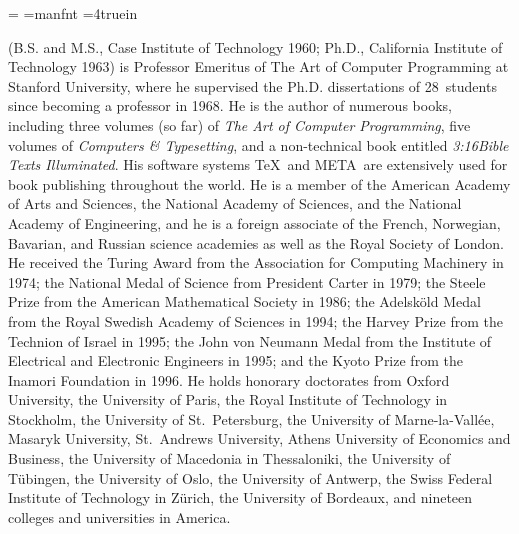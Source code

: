 \magnification=
\font\logo=manfnt %
\def\MF{{\logo META}\-{\logo FONT}}
\hsize=4truein
\raggedright

 (B.S. and M.S., Case Institute of
Technology 1960; Ph.D., California Institute of Technology 1963) is
Professor Emeritus of The Art of Computer Programming at Stanford University,
where he supervised the Ph.D. dissertations of 28~students since
becoming a professor in 1968. He is the author of numerous books,
including three volumes (so far) of {\sl The Art of Computer
Programming}, five volumes of {\sl Computers \& Typesetting},
and a non-technical book entitled {\sl 3:16\enspace Bible Texts Illuminated}.
His software systems \TeX\ and \MF\ are extensively used for book publishing
throughout the world.
He is a member of the American Academy of Arts and Sciences, the
National Academy of Sciences, and the National Academy of Engineering,
and he is a foreign associate of the French, Norwegian, Bavarian, and Russian
science academies as well as the Royal Society of London.
He received the Turing Award from the Association for Computing
Machinery in 1974; the National Medal of Science from President
Carter in 1979; the Steele Prize from the American Mathematical Society
in 1986; the Adelsk\"old Medal from the Royal Swedish Academy of
Sciences in 1994; the Harvey Prize from the Technion of Israel in 1995;
the John von Neumann Medal from the Institute of Electrical and Electronic
Engineers in 1995; and the Kyo\-to Prize from the Ina\-mori Foundation in 1996.
He holds honorary doctorates from Oxford University,
the University of Paris,
the Royal Institute of Technology in Stockholm, 
the University of St.~Petersburg,
the University of Marne-la-Vall\'ee,
Masaryk University,
St.~Andrews University,
Athens University of Economics and Business,
the University of Macedonia in Thessaloniki,
the University of T\"ubingen,
the University of Oslo,
the University of Antwerp,
the Swiss Federal Institute of Technology in Z\"urich,
the University of Bordeaux,
and nineteen colleges and universities in America.

\nopagenumbers
\bye
